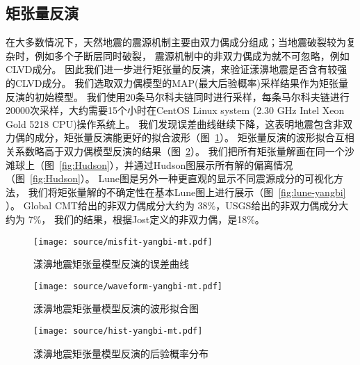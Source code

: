 \subsection{矩张量反演}

在大多数情况下，天然地震的震源机制主要由双力偶成分组成；当地震破裂较为复杂时，例如多个子断层同时破裂，
震源机制中的非双力偶成为就不可忽略，例如CLVD成分。
因此我们进一步进行矩张量的反演，来验证漾濞地震是否含有较强的CLVD成分。
我们选取双力偶模型的MAP(最大后验概率)采样结果作为矩张量反演的初始模型。
我们使用20条马尔科夫链同时进行采样，每条马尔科夫链进行20000次采样，大约需要15个小时在CentOS Linux system (2.30 GHz Intel Xeon Gold 5218 CPU)操作系统上。
我们发现误差曲线继续下降，这表明地震包含非双力偶的成分，矩张量反演能更好的拟合波形（图~\ref{fig:misfit-yangbi-mt}）。
矩张量反演的波形拟合互相关系数略高于双力偶模型反演的结果（图~\ref{fig:waveform-yangbi-mt}）。
我们把所有矩张量解画在同一个沙滩球上（图~\ref{fig:Hudson}），并通过Hudson图展示所有解的偏离情况（图~\ref{fig:Hudson}）。
Lune图是另外一种更直观的显示不同震源成分的可视化方法\citep{Tape2012}，
我们将矩张量解的不确定性在基本Lune图上进行展示（图~\ref{fig:lune-yangbi} ）。
Global CMT给出的非双力偶成分大约为 38\%，USGS给出的非双力偶成分大约为 7\%，
我们的结果，根据Jost\citep{Jost1989}定义的非双力偶，是18\%。


\begin{figure}[h]
    \centering
    \texttt{[image: source/misfit-yangbi-mt.pdf]}
    \caption{漾濞地震矩张量模型反演的误差曲线}
    \label{fig:misfit-yangbi-mt}
\end{figure}



\begin{figure}[h]
    \centering
    \texttt{[image: source/waveform-yangbi-mt.pdf]}
    \caption{漾濞地震矩张量模型反演的波形拟合图}
    \label{fig:waveform-yangbi-mt}
\end{figure}


\begin{figure}[h]
    \centering
    \texttt{[image: source/hist-yangbi-mt.pdf]}
    \caption{漾濞地震矩张量模型反演的后验概率分布}
    \label{fig:hist-yangbi-mt}
\end{figure}



